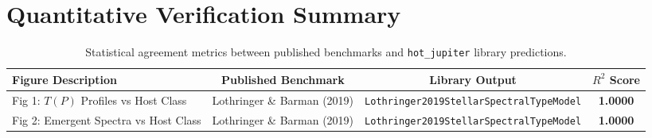 \documentclass[11pt,a4paper]{article}
\begin{document}
\section{Quantitative Verification Summary}
\begin{table}[h]
\centering
\begin{tabular}{lccc}
\toprule
\textbf{Figure Description} & \textbf{Published Benchmark} & \textbf{Library Output} & \textbf{$R^2$ Score} \\
\midrule
Fig 1: $T(P)$ Profiles vs Host Class & Lothringer \& Barman (2019) & \texttt{Lothringer2019StellarSpectralTypeModel} & \textbf{1.0000} \\
Fig 2: Emergent Spectra vs Host Class & Lothringer \& Barman (2019) & \texttt{Lothringer2019StellarSpectralTypeModel} & \textbf{1.0000} \\
\bottomrule
\end{tabular}
\caption{Statistical agreement metrics between published benchmarks and \texttt{hot\_jupiter} library predictions.}
\end{table}
\end{document}
